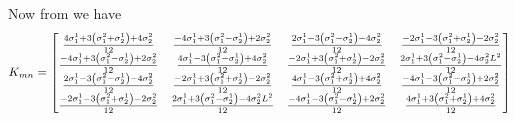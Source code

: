 Now from  we have
\begin{equation}
  K_{mn}=\begin{bmatrix}
  \frac{4 \sigma ^{1}_{1}+3\left(  \sigma ^{2}_{1}+
       \sigma ^{1}_{2} \right)+4 \sigma ^{2}_{2}}{12} &
  \frac{-4 \sigma ^{1}_{1}+3\left(  \sigma ^{2}_{1}-
       \sigma ^{1}_{2} \right)+2 \sigma ^{2}_{2}}{12} &
  \frac{2 \sigma ^{1}_{1}-3\left(  \sigma ^{2}_{1}-
       \sigma ^{1}_{2} \right)-4 \sigma ^{2}_{2}}{12} &
  \frac{-2 \sigma ^{1}_{1}-3\left(  \sigma ^{2}_{1}+
         \sigma ^{1}_{2} \right)-2 \sigma ^{2}_{2}}{12} \\
  \frac{-4 \sigma ^{1}_{1}+3\left(  \sigma ^{2}_{1}-
       \sigma ^{1}_{2} \right)+2 \sigma ^{2}_{2}}{12} &
  \frac{4 \sigma ^{1}_{1}-3\left(  \sigma ^{2}_{1}-
       \sigma ^{1}_{2} \right)+4 \sigma ^{2}_{2}}{12} &
  \frac{-2 \sigma ^{1}_{1}+3\left(  \sigma ^{2}_{1}+
         \sigma ^{1}_{2} \right)-2 \sigma ^{2}_{2}}{12} &
  \frac{2 \sigma ^{1}_{1}+3\left(  \sigma ^{2}_{1}-
         \sigma ^{1}_{2} \right)-4 \sigma ^{2}_{2}L^{2}}{12} \\
  \frac{2 \sigma ^{1}_{1}-3\left(  \sigma ^{2}_{1}-
       \sigma ^{1}_{2} \right)-4 \sigma ^{2}_{2}}{12} &
  \frac{-2 \sigma ^{1}_{1}+3\left(  \sigma ^{2}_{1}+
         \sigma ^{1}_{2} \right)-2 \sigma ^{2}_{2}}{12} &
  \frac{4 \sigma ^{1}_{1}-3\left(  \sigma ^{2}_{1}+
       \sigma ^{1}_{2} \right)+4 \sigma ^{2}_{2}}{12} &
  \frac{-4 \sigma ^{1}_{1}-3\left(  \sigma ^{2}_{1}-
       \sigma ^{1}_{2} \right)+2 \sigma ^{2}_{2}}{12} \\
  \frac{-2 \sigma ^{1}_{1}-3\left(  \sigma ^{2}_{1}+
         \sigma ^{1}_{2} \right)-2 \sigma ^{2}_{2}}{12} &
  \frac{2 \sigma ^{1}_{1}+3\left(  \sigma ^{2}_{1}-
         \sigma ^{1}_{2} \right)-4 \sigma ^{2}_{2}L^{2}}{12}&
  \frac{-4 \sigma ^{1}_{1}-3\left(  \sigma ^{2}_{1}-
       \sigma ^{1}_{2} \right)+2 \sigma ^{2}_{2}}{12} &
  \frac{4 \sigma ^{1}_{1}+3\left(  \sigma ^{2}_{1}+
       \sigma ^{1}_{2} \right)+4 \sigma ^{2}_{2}}{12}
  \end{bmatrix}
\end{equation}

